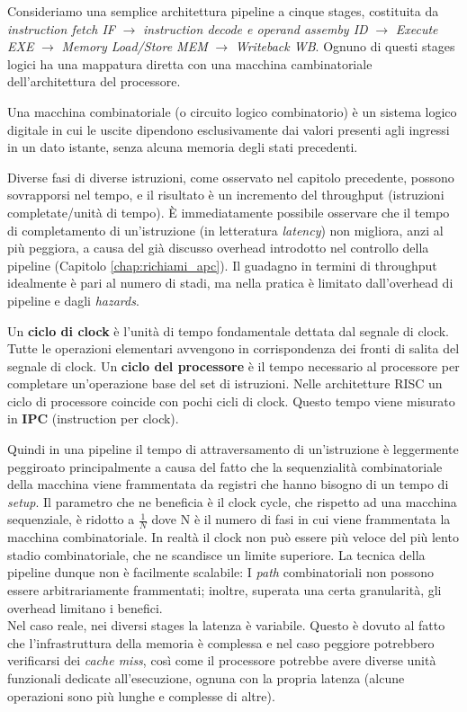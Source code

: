 \sloppy
Consideriamo una semplice architettura pipeline a cinque stages, costituita da \textit{instruction fetch IF} $\rightarrow$ \textit{instruction decode e operand assemby ID} $\rightarrow$ \textit{Execute EXE} $\rightarrow$ \textit{Memory Load/Store MEM} $\rightarrow$ \textit{Writeback WB}. Ognuno di questi stages logici ha una mappatura diretta con una macchina cambinatoriale dell'architettura del processore.

\begin{info}
Una macchina combinatoriale (o circuito logico combinatorio) è un sistema logico digitale in cui le uscite dipendono esclusivamente dai valori presenti agli ingressi in un dato istante, senza alcuna memoria degli stati precedenti.
\end{info}

\noindent Diverse fasi di diverse istruzioni, come osservato nel capitolo precedente, possono sovrapporsi nel tempo, e il risultato è un incremento del throughput (istruzioni completate/unità di tempo).
\uppercase{è} immediatamente possibile osservare che il tempo di completamento di un'istruzione (in letteratura \textit{latency}) non migliora, anzi al più peggiora, a causa del già discusso overhead introdotto nel controllo della pipeline (Capitolo \ref{chap:richiami_apc}). Il guadagno in termini di throughput idealmente è pari al numero di stadi, ma nella pratica è limitato dall'overhead di pipeline e dagli \textit{hazards}. 

\begin{warn}
Un \textbf{ciclo di clock} è l'unità di tempo fondamentale dettata dal segnale di clock. Tutte le operazioni elementari avvengono in corrispondenza dei fronti di salita del segnale di clock. Un \textbf{ciclo del processore} è il tempo necessario al processore per completare un'operazione base del set di istruzioni. Nelle architetture RISC un ciclo di processore coincide con pochi cicli di clock. Questo tempo viene misurato in \textbf{IPC} (instruction per clock).
\end{warn}

\noindent Quindi in una pipeline il tempo di attraversamento di un'istruzione è leggermente peggiroato principalmente a causa del fatto che la sequenzialità combinatoriale della macchina viene frammentata da registri che hanno bisogno di un tempo di \textit{setup}. Il parametro che ne beneficia è il clock cycle, che rispetto ad una macchina sequenziale, è ridotto a $\frac{1}{N}$ dove N è il numero di fasi in cui viene frammentata la macchina combinatoriale. In realtà il clock non può essere più veloce del più lento stadio combinatoriale, che ne scandisce un limite superiore. La tecnica della pipeline dunque non è facilmente scalabile: I \textit{path} combinatoriali non possono essere arbitrariamente frammentati; inoltre, superata una certa granularità, gli overhead limitano i benefici. \\ \noindent Nel caso reale, nei diversi stages la latenza è variabile. Questo è dovuto al fatto che l'infrastruttura della memoria è complessa e nel caso peggiore potrebbero verificarsi dei \textit{cache miss}, così come il processore potrebbe avere diverse unità funzionali dedicate all'esecuzione, ognuna con la propria latenza (alcune operazioni sono più lunghe e complesse di altre).

